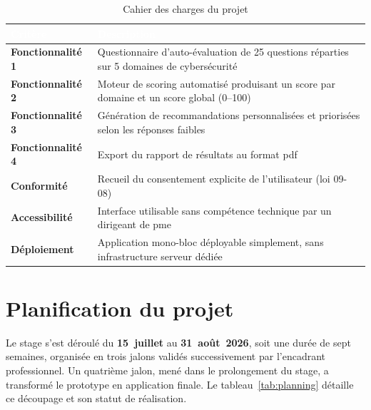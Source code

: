 \begin{table}[H]
  \centering
  \caption{Cahier des charges du projet}
  \label{tab:cahier_charges}
  \renewcommand{\arraystretch}{1.4}
  \begin{tabularx}{\textwidth}{|>{\bfseries\color{iacsPrimary}}l|X|}
    \hline
    \rowcolor{iacsTableHead}
    \textbf{\textcolor{white}{Critère}} & \textbf{\textcolor{white}{Description}} \\
    \hline
    Fonctionnalité 1 & Questionnaire d'auto-évaluation de 25 questions réparties sur 5 domaines de cybersécurité \\
    \hline
    Fonctionnalité 2 & Moteur de scoring automatisé produisant un score par domaine et un score global (0--100) \\
    \hline
    Fonctionnalité 3 & Génération de recommandations personnalisées et priorisées selon les réponses faibles \\
    \hline
    Fonctionnalité 4 & Export du rapport de résultats au format \gls{pdf} \\
    \hline
    Conformité & Recueil du consentement explicite de l'utilisateur (loi 09-08) \\
    \hline
    Accessibilité & Interface utilisable sans compétence technique par un dirigeant de \gls{pme} \\
    \hline
    Déploiement & Application mono-bloc déployable simplement, sans infrastructure serveur dédiée \\
    \hline
  \end{tabularx}
\end{table}

\section{Planification du projet}
\label{sec:planification}

Le stage s'est déroulé du \textbf{15~juillet} au \textbf{31~août~2026}, soit une durée de sept semaines, organisée en trois jalons validés successivement par l'encadrant professionnel. Un quatrième jalon, mené dans le prolongement du stage, a transformé le prototype en application finale. Le tableau~\ref{tab:planning} détaille ce découpage et son statut de réalisation.

